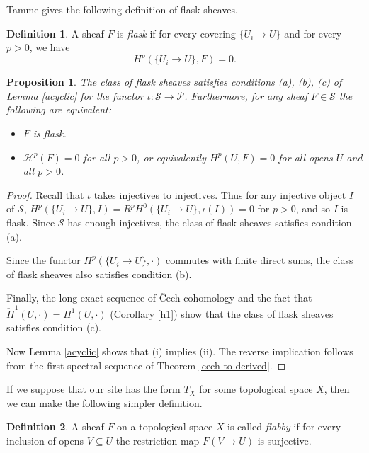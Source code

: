 \documentclass[letterpaper,11pt]{article}
\newtheorem{prop}{Proposition}
\theoremstyle{definition}
\newtheorem{defn}{Definition}
\theoremstyle{remark}
\begin{document}
Tamme \cite{etale} gives the following definition of flask sheaves.

\begin{defn} A sheaf $F$ is \emph{flask} if for every covering $\{U_i\rightarrow U\}$ and for every $p > 0$, we have
\[
H^p(\{U_i\rightarrow U\},F) = 0.
\]
\end{defn}

\begin{prop}\label{flask} The class of flask sheaves satisfies conditions {\rm (a), (b), (c)} of Lemma \ref{acyclic} for the functor $\iota : \mathcal{S} \rightarrow \mathcal{P}$. Furthermore, for any sheaf $F\in \mathcal{S}$ the following are equivalent:
\begin{itemize}
\item[{\rm (i)}] $F$ is flask.

\item[{\rm (ii)}] $\mathcal{H}^p(F) = 0$ for all $p > 0$, or equivalently $H^p(U,F) = 0$ for all opens $U$ and all $p > 0$.
\end{itemize}
\end{prop}
\begin{proof} Recall that $\iota$ takes injectives to injectives. Thus for any injective object $I$ of $\mathcal{S}$, $H^p(\{U_i\rightarrow U\},I) = R^pH^0(\{U_i\rightarrow U\},\iota(I)) = 0$ for $p > 0$, and so $I$ is flask. Since $\mathcal{S}$ has enough injectives, the class of flask sheaves satisfies condition (a).

Since the functor $H^p(\{U_i\rightarrow U\},\cdot)$ commutes with finite direct sums, the class of flask sheaves also satisfies condition (b).

Finally, the long exact sequence of \v{C}ech cohomology and the fact that $\check{H}^1(U,\cdot) = H^1(U,\cdot)$ (Corollary \ref{h1}) show that the class of flask sheaves satisfies condition (c).

Now Lemma \ref{acyclic} shows that (i) implies (ii). The reverse implication follows from the first spectral sequence of Theorem \ref{cech-to-derived}.
\end{proof}

If we suppose that our site has the form $T_X$ for some topological space $X$, then we can make the following simpler definition.

\begin{defn} A sheaf $F$ on a topological space $X$ is called \emph{flabby} if for every inclusion of opens $V\subseteq U$ the restriction map $F(V\rightarrow U)$ is surjective.
\end{defn}
\end{document}
